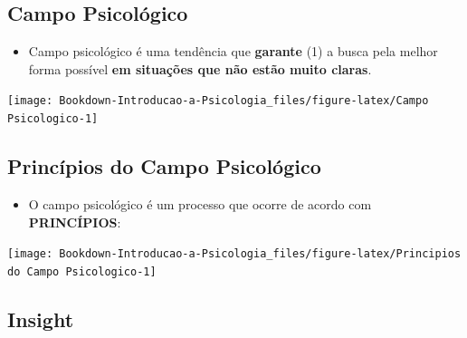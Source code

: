 \documentclass[
]{book}
\providecommand{\tightlist}{%
  \setlength{\itemsep}{0pt}\setlength{\parskip}{0pt}}
\begin{document}
\hypertarget{campo-psicoluxf3gico-1}{%
\subsection{Campo Psicológico}\label{campo-psicoluxf3gico-1}}

\begin{itemize}
\tightlist
\item
  Campo psicológico é uma tendência que \textbf{garante} (1) a busca pela melhor forma possível \textbf{em situações que não estão muito claras}.
\end{itemize}

\texttt{[image: Bookdown-Introducao-a-Psicologia\_files/figure-latex/Campo Psicologico-1]}

\hypertarget{princuxedpios-do-campo-psicoluxf3gico-1}{%
\subsection{Princípios do Campo Psicológico}\label{princuxedpios-do-campo-psicoluxf3gico-1}}

\begin{itemize}
\tightlist
\item
  O campo psicológico é um processo que ocorre de acordo com \textbf{PRINCÍPIOS}:
\end{itemize}

\texttt{[image: Bookdown-Introducao-a-Psicologia\_files/figure-latex/Principios do Campo Psicologico-1]}

\hypertarget{insight-1}{%
\subsection{Insight}\label{insight-1}}
\end{document}
